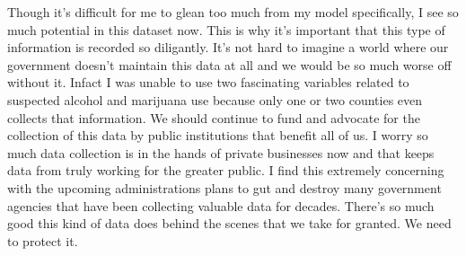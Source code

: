 Though it's difficult for me to glean too much from my model specifically, I see so much potential in this dataset now. This is why it's important that this type of information is recorded so diligantly. It's not hard to imagine a world where our government doesn't maintain this data at all and we would be so much worse off without it. Infact I was unable to use two fascinating variables related to suspected alcohol and marijuana use because only one or two counties even collects that information. We should continue to fund and advocate for the collection of this data by public institutions that benefit all of us. I worry so much data collection is in the hands of private businesses now and that keeps data from truly working for the greater public. I find this extremely concerning with the upcoming administrations plans to gut and destroy many government agencies that have been collecting valuable data for decades. There's so much good this kind of data does behind the scenes that we take for granted. We need to protect it.